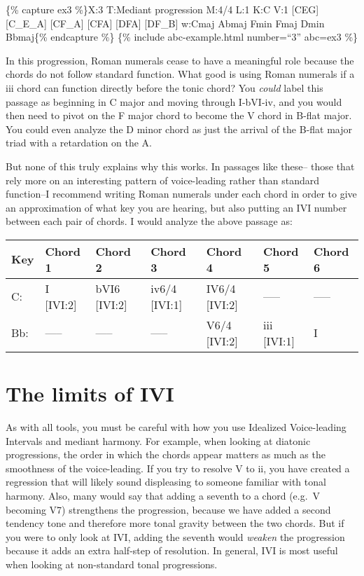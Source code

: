 \documentclass{book}
\begin{document}
\{\% capture ex3 \%\}X:3 T:Mediant progression M:4/4 L:1 K:C V:1
{[}CEG{]}\textbar{} {[}C\_E\_A{]}\textbar{} {[}CF\_A{]}\textbar{}
{[}CFA{]}\textbar{} {[}DFA{]}\textbar{} {[}DF\_B{]}\textbar{]} w:Cmaj Abmaj
Fmin Fmaj Dmin Bbmaj\{\% endcapture \%\} \{\% include abc-example.html
number=``3'' abc=ex3 \%\}

In this progression, Roman numerals cease to have a meaningful role because
the chords do not follow standard function. What good is using Roman numerals
if a iii chord can function directly before the tonic chord? You \emph{could}
label this passage as beginning in C major and moving through I-bVI-iv, and
you would then need to pivot on the F major chord to become the V chord in
B-flat major. You could even analyze the D minor chord as just the arrival of
the B-flat major triad with a retardation on the A.

But none of this truly explains why this works. In passages like these-- those
that rely more on an interesting pattern of voice-leading rather than standard
function--I recommend writing Roman numerals under each chord in order to give
an approximation of what key you are hearing, but also putting an IVI number
between each pair of chords. I would analyze the above passage as:

\begin{longtable}[]{@{}lllllll@{}}
\toprule
Key & Chord 1 & Chord 2 & Chord 3 & Chord 4 & Chord 5 & Chord 6 \\
\midrule
\endhead
C: & I {[}IVI:2{]} & bVI6 {[}IVI:2{]} & iv6/4 {[}IVI:1{]} & IV6/4 {[}IVI:2{]}
& ----- & ----- \\
Bb: & ----- & ----- & ----- & V6/4 {[}IVI:2{]} & iii {[}IVI:1{]} & I \\
\bottomrule
\end{longtable}

\hypertarget{the-limits-of-ivi}{%
\section{The limits of IVI}\label{the-limits-of-ivi}}

As with all tools, you must be careful with how you use Idealized
Voice-leading Intervals and mediant harmony. For example, when looking at
diatonic progressions, the order in which the chords appear matters as much as
the smoothness of the voice-leading. If you try to resolve V to ii, you have
created a regression that will likely sound displeasing to someone familiar
with tonal harmony. Also, many would say that adding a seventh to a chord
(e.g.~V becoming V7) strengthens the progression, because we have added a
second tendency tone and therefore more tonal gravity between the two chords.
But if you were to only look at IVI, adding the seventh would \emph{weaken}
the progression because it adds an extra half-step of resolution. In general,
IVI is most useful when looking at non-standard tonal progressions.
\end{document}
